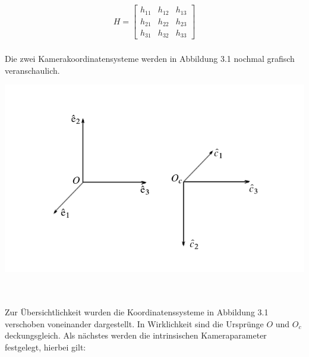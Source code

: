 \begin{gather}
H=
\begin{bmatrix}
h_{11}&h_{12}&h_{13}\\
h_{21}&h_{22}&h_{23}\\
h_{31}&h_{32}&h_{33}
\end{bmatrix}
\end{gather}\\

Die zwei Kamerakoordinatensysteme werden in Abbildung 3.1 nochmal grafisch veranschaulich.

\begin{minipage}{\linewidth}
	\centering
	\includegraphics[width=1.\linewidth]{images/Rotation.png}
\end{minipage}\\ \\

Zur Übersichtlichkeit wurden die Koordinatenssysteme in Abbildung 3.1 verschoben voneinander dargestellt. In Wirklichkeit sind die Ursprünge \ensuremath{O} und \ensuremath{O_c} deckungsgleich. Als nächstes werden die intrinsischen Kameraparameter festgelegt, hierbei gilt: 


